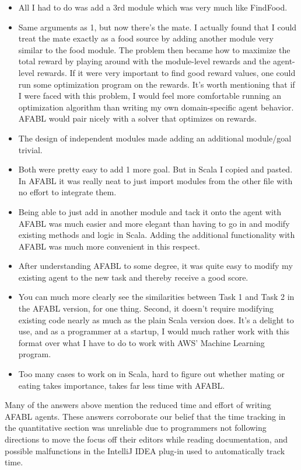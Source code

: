 \begin{itemize}
\item All I had to do was add a 3rd module which was very much like FindFood.
\item Same arguments as 1, but now there's the mate. I actually found that I could treat the mate exactly as a food source by adding another module very similar to the food module. The problem then became how to maximize the total reward by playing around with the module-level rewards and the agent-level rewards. If it were very important to find good reward values, one could run some optimization program on the rewards. It's worth mentioning that if I were faced with this problem, I would feel more comfortable running an optimization algorithm than writing my own domain-specific agent behavior. AFABL would pair nicely with a solver that optimizes on rewards.
\item The design of independent modules made adding an additional module/goal trivial.
\item Both were pretty easy to add 1 more goal. But in Scala I copied and pasted. In AFABL it was really neat to just import modules from the other file with no effort to integrate them.
\item Being able to just add in another module and tack it onto the agent with AFABL was much easier and more elegant than having to go in and modify existing methods and logic in Scala. Adding the additional functionality with AFABL was much more convenient in this respect.
\item After understanding AFABL to some degree, it was quite easy to modify my existing agent to the new task and thereby receive a good score.
\item You can much more clearly see the similarities between Task 1 and Task 2 in the AFABL version, for one thing. Second, it doesn't require modifying existing code nearly as much as the plain Scala version does. It's a delight to use, and as a programmer at a startup, I would much rather work with this format over what I have to do to work with AWS' Machine Learning program.
\item Too many cases to work on in Scala, hard to figure out whether mating or eating takes importance, takes far less time with AFABL.
\end{itemize}

Many of the answers above mention the reduced time and effort of writing AFABL agents. These answers corroborate our belief that the time tracking in the quantitative section was unreliable due to programmers not following directions to move the focus off their editors while reading documentation, and possible malfunctions in the IntelliJ IDEA plug-in used to automatically track time.

